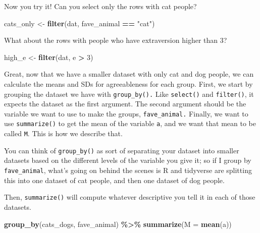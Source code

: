 \documentclass[
]{article}
\newenvironment{Shaded}{\begin{snugshade}}{\end{snugshade}}
\newcommand{\AttributeTok}[1]{\textcolor[rgb]{0.13,0.29,0.53}{#1}}
\newcommand{\DecValTok}[1]{\textcolor[rgb]{0.00,0.00,0.81}{#1}}
\newcommand{\FunctionTok}[1]{\textcolor[rgb]{0.13,0.29,0.53}{\textbf{#1}}}
\newcommand{\NormalTok}[1]{#1}
\newcommand{\OtherTok}[1]{\textcolor[rgb]{0.56,0.35,0.01}{#1}}
\newcommand{\SpecialCharTok}[1]{\textcolor[rgb]{0.81,0.36,0.00}{\textbf{#1}}}
\newcommand{\StringTok}[1]{\textcolor[rgb]{0.31,0.60,0.02}{#1}}
\begin{document}
Now you try it! Can you select only the rows with cat people?

\begin{Shaded}
\begin{Highlighting}[]
\NormalTok{cats\_only }\OtherTok{\textless{}{-}} \FunctionTok{filter}\NormalTok{(dat, fave\_animal }\SpecialCharTok{==} \StringTok{"cat"}\NormalTok{)}
\end{Highlighting}
\end{Shaded}

What about the rows with people who have extraversion higher than 3?

\begin{Shaded}
\begin{Highlighting}[]
\NormalTok{high\_e }\OtherTok{\textless{}{-}} \FunctionTok{filter}\NormalTok{(dat, e }\SpecialCharTok{\textgreater{}} \DecValTok{3}\NormalTok{)}
\end{Highlighting}
\end{Shaded}

Great, now that we have a smaller dataset with only cat and dog people,
we can calculate the means and SDs for agreeableness for each group.
First, we start by grouping the dataset we have with
\texttt{group\_by().} Like \texttt{select()} and \texttt{filter()}, it
expects the dataset as the first argument. The second argument should be
the variable we want to use to make the groups, \texttt{fave\_animal.}
Finally, we want to use \texttt{summarize()} to get the mean of the
variable \texttt{a}, and we want that mean to be called \texttt{M}. This
is how we describe that.

You can think of \texttt{group\_by()} as sort of separating your dataset
into smaller datasets based on the different levels of the variable you
give it; so if I group by \texttt{fave\_animal}, what's going on behind
the scenes is R and tidyverse are splitting this into one dataset of cat
people, and then one dataset of dog people.

Then, \texttt{summarize()} will compute whatever descriptive you tell it
in each of those datasets.

\begin{Shaded}
\begin{Highlighting}[]
\FunctionTok{group\_by}\NormalTok{(cats\_dogs, fave\_animal) }\SpecialCharTok{\%\textgreater{}\%} 
  \FunctionTok{summarize}\NormalTok{(}\AttributeTok{M =} \FunctionTok{mean}\NormalTok{(a))}
\end{Highlighting}
\end{Shaded}
\end{document}
